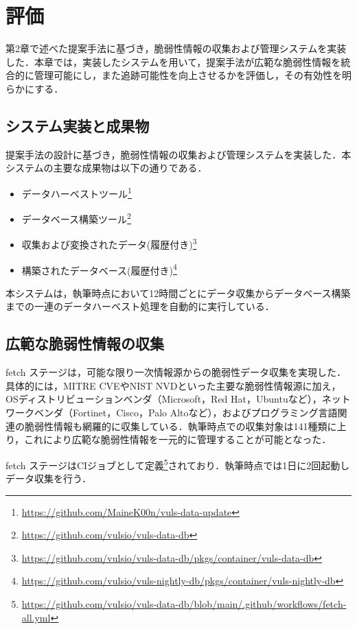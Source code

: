 \section{評価}

第2章で述べた提案手法に基づき，脆弱性情報の収集および管理システムを実装した．本章では，実装したシステムを用いて，提案手法が広範な脆弱性情報を統合的に管理可能にし，また追跡可能性を向上させるかを評価し，その有効性を明らかにする．

\subsection{システム実装と成果物}

提案手法の設計に基づき，脆弱性情報の収集および管理システムを実装した．本システムの主要な成果物は以下の通りである．

\begin{itemize}
  \item データハーベストツール\footnote{\url{https://github.com/MaineK00n/vuls-data-update}}
  \item データベース構築ツール\footnote{\url{https://github.com/vulsio/vuls-data-db}}
  \item 収集および変換されたデータ(履歴付き)\footnote{\url{https://github.com/vulsio/vuls-data-db/pkgs/container/vuls-data-db}}
  \item 構築されたデータベース(履歴付き)\footnote{\url{https://github.com/vulsio/vuls-nightly-db/pkgs/container/vuls-nightly-db}}
\end{itemize}

本システムは，執筆時点において12時間ごとにデータ収集からデータベース構築までの一連のデータハーベスト処理を自動的に実行している．

\subsection{広範な脆弱性情報の収集}

fetch ステージは，可能な限り一次情報源からの脆弱性データ収集を実現した．具体的には，MITRE CVEやNIST NVDといった主要な脆弱性情報源に加え，OSディストリビューションベンダ（Microsoft，Red Hat，Ubuntuなど），ネットワークベンダ（Fortinet，Cisco，Palo Altoなど），およびプログラミング言語関連の脆弱性情報も網羅的に収集している．執筆時点での収集対象は141種類に上り，これにより広範な脆弱性情報を一元的に管理することが可能となった．

fetch ステージはCIジョブとして定義\footnote{\url{https://github.com/vulsio/vuls-data-db/blob/main/.github/workflows/fetch-all.yml}}されており．執筆時点では1日に2回起動しデータ収集を行う．

